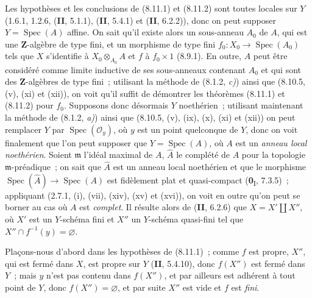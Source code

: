 \begin{env}[8.11.4]
\label{IV.8.11.4-fr}
Les hypothèses et les conclusions de (8.11.1) et (8.11.2) sont toutes locales
sur $Y$ (1.6.1, 1.2.6, (\textbf{II}, 5.1.1), (\textbf{II}, 5.4.1) et (\textbf{II}, 6.2.2)), donc on
peut supposer $Y=\operatorname{Spec}(A)$ affine. On sait qu'il existe alors un
sous-anneau $A_0$ de $A$, qui est une $\mathbf Z$-algèbre de type fini, et un
morphisme de type fini $f_0:X_0\to\operatorname{Spec}(A_0)$ tels que $X$
s'identifie à $X_0\otimes_{A_0}A$ et $f$ à $f_0\times1$ (8.9.1). En outre,
$A$ peut être considéré comme limite inductive de ses sous-anneaux contenant
$A_0$ et qui sont des $\mathbf Z$-algèbres de type fini~; utilisant la méthode
de (8.1.2, \emph{c)}) ainsi que (8.10.5, (v), (xi) et (xii)), on voit qu'il suffit de
démontrer les théorèmes (8.11.1) et (8.11.2) pour $f_0$. Supposons donc
désormais $Y$ noethérien~; utilisant maintenant la méthode de (8.1.2, \emph{a)})
ainsi que (8.10.5, (v), (ix), (x), (xi) et (xii)) on peut remplacer $Y$ par
$\operatorname{Spec}(\mathcal O_y)$, où $y$ est un
point quelconque de $Y$, donc on voit finalement que l'on peut supposer que
$Y=\operatorname{Spec}(A)$, où $A$ est un \emph{anneau local noethérien}.
Soient $\mathfrak m$ l'idéal maximal de $A$, $\widehat A$ le complété de $A$
pour la topologie $\mathfrak m$-préadique~; on sait que $\widehat A$ est un
anneau local noethérien et que le morphisme
$\operatorname{Spec}(\widehat A)\to\operatorname{Spec}(A)$ est fidèlement
plat et quasi-compact (\textbf{0}\textsubscript{I}, 7.3.5)~; appliquant (2.7.1, (i),
(vii), (xiv), (xv) et (xvi)), on voit en outre qu'on peut se borner au cas où
$A$ est \emph{complet}. Il résulte alors de (\textbf{II}, 6.2.6) que
$X=X'\amalg X''$, où $X'$ est un $Y$-schéma fini et $X''$ un $Y$-schéma
quasi-fini tel que $X''\cap f^{-1}(y)=\varnothing$.
\end{env}

Plaçons-nous d'abord dans les hypothèses de (8.11.1)~; comme $f$ est propre,
$X''$, qui est fermé dans $X$, est propre sur $Y$ (\textbf{II}, 5.4.10), donc
$f(X'')$ est fermé dans $Y$~; mais $y$ n'est pas contenu dans $f(X'')$, et
par ailleurs est adhérent à tout point de $Y$, donc $f(X'')=\varnothing$, et
par suite $X''$ est vide et $f$ est \emph{fini}.

